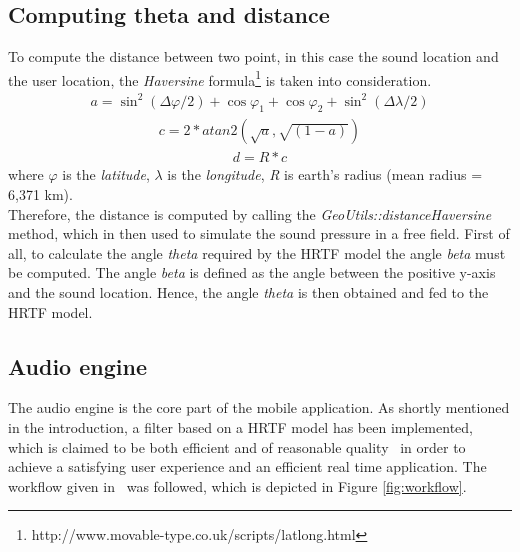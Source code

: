 \documentclass[journal]{IEEEtran}
\begin{document}
\subsection{Computing theta and distance}
To compute the distance between two point, in this case the sound location and the user location, the \textit{Haversine} formula\footnote{http://www.movable-type.co.uk/scripts/latlong.html} is taken into consideration.
\begin{equation}\label{eq:distancehaversine1}
\begin{split}
  a = {\sin}^{2}(\Delta\varphi / 2) + \cos \varphi _1 + \cos \varphi _2 + \sin^2(\Delta\lambda / 2)
\end{split}
\end{equation}
\begin{equation}\label{eq:distancehaversine2}
\begin{split}
  c = 2 * atan2(\sqrt{a},\sqrt{(1-a)}) 
\end{split}
\end{equation}
\begin{equation}\label{eq:distancehaversine3}
\begin{split}
  d = R * c
\end{split}
\end{equation}
where $\varphi$ is the \emph{latitude}, $\lambda$ is the \emph{longitude}, \emph{R} is earth's radius (mean radius = 6,371 km). \\
Therefore, the distance is computed by calling the \emph{GeoUtils::distanceHaversine} method, which in then used to simulate the sound pressure in a free field. First of all, to calculate the angle \textit{theta} required by the HRTF model the angle \textit{beta} must be computed. The angle \textit{beta} is defined as the angle between the positive y-axis and the sound location. Hence, the angle \textit{theta} is then obtained and fed to the HRTF model.

\subsection{Audio engine}
The audio engine is the core part of the mobile application. As shortly mentioned in the introduction, a filter based on a HRTF model has been implemented, which is claimed to be both efficient and of reasonable quality~\cite{Brown1997} in order to achieve a satisfying user experience and an efficient real time application. The workflow given in~\cite{Brown1997} was followed, which is depicted in Figure \ref{fig:workflow}. 
\end{document}
